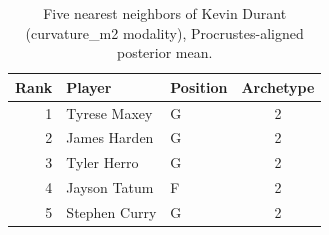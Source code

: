 \begin{table}[htbp]
  \centering\small
  \begin{tabular}{rllc}
    \toprule
    Rank & Player & Position & Archetype \\
    \midrule
    1 & Tyrese Maxey & G & 2 \\
    2 & James Harden & G & 2 \\
    3 & Tyler Herro & G & 2 \\
    4 & Jayson Tatum & F & 2 \\
    5 & Stephen Curry & G & 2 \\
    \bottomrule
  \end{tabular}
  \caption{Five nearest neighbors of Kevin Durant (curvature_m2 modality), Procrustes-aligned posterior mean.}
  \label{tab:Kevin_Durant_neighbors_curvature_m2}
\end{table}

